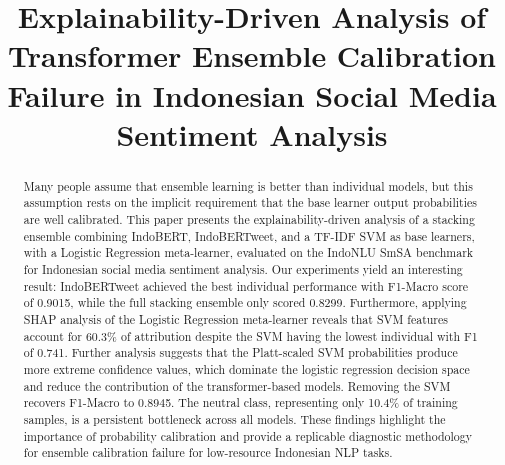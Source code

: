 \documentclass[conference]{IEEEtran}
\begin{document}
\title{Explainability-Driven Analysis of Transformer Ensemble Calibration Failure in Indonesian Social Media Sentiment Analysis}

\author{
\and
{}
}

\maketitle

\begin{abstract}
Many people assume that ensemble learning is better than individual models, but this assumption rests on the implicit requirement that the base learner output probabilities are well calibrated. This paper presents the explainability-driven analysis of a stacking ensemble combining IndoBERT, IndoBERTweet, and a TF-IDF SVM as base learners, with a Logistic Regression meta-learner, evaluated on the IndoNLU SmSA benchmark for Indonesian social media sentiment analysis. Our experiments yield an interesting result: IndoBERTweet achieved the best individual performance with F1-Macro score of 0.9015, while the full stacking ensemble only scored 0.8299. Furthermore, applying SHAP analysis of the Logistic Regression meta-learner reveals that SVM features account for 60.3\% of attribution despite the SVM having the lowest individual with F1 of 0.741. Further analysis suggests that the Platt-scaled SVM probabilities produce more extreme confidence values, which dominate the logistic regression decision space and reduce the contribution of the transformer-based models. Removing the SVM recovers F1-Macro to 0.8945. The neutral class, representing only 10.4\% of training samples, is a persistent bottleneck across all models. These findings highlight the importance of probability calibration and provide a replicable diagnostic methodology for ensemble calibration failure for low-resource Indonesian NLP tasks.
\end{abstract}
\end{document}
